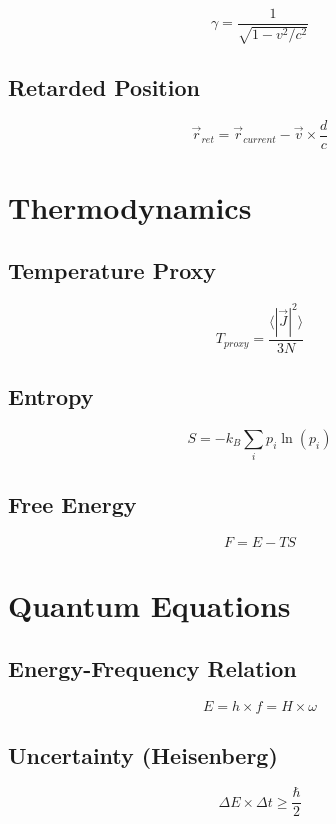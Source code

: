 \documentclass[
  11pt,
  letterpaper,
  twoside,
  openright]{book}
\begin{document}
\[
\gamma = \frac{1}{\sqrt{1 - v^2/c^2}}
\]

\subsection{Retarded Position}\label{retarded-position}

\[
\vec{r}_{ret} = \vec{r}_{current} - \vec{v} \times \frac{d}{c}
\]

\section{Thermodynamics}\label{thermodynamics}

\subsection{Temperature Proxy}\label{temperature-proxy}

\[
T_{proxy} = \frac{\langle|\vec{J}|^2\rangle}{3 N}
\]

\subsection{Entropy}\label{entropy}

\[
S = -k_B \sum_i p_i \ln(p_i)
\]

\subsection{Free Energy}\label{free-energy-1}

\[
F = E - TS
\]

\section{Quantum Equations}\label{quantum-equations}

\subsection{Energy-Frequency Relation}\label{energy-frequency-relation}

\[
E = h \times f = H \times \omega
\]

\subsection{Uncertainty (Heisenberg)}\label{uncertainty-heisenberg}

\[
\Delta E \times \Delta t \geq \frac{\hbar}{2}
\]
\end{document}
